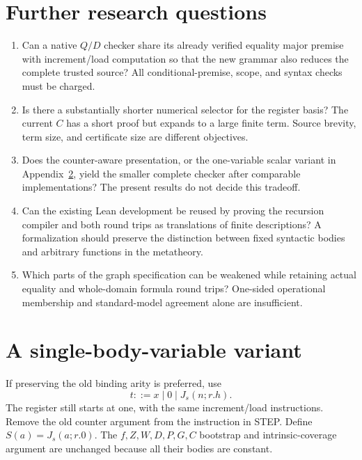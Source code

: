\documentclass[11pt,letterpaper]{article}
\theoremstyle{definition}\newtheorem{definition}[theorem]{Definition}
\theoremstyle{remark}\newtheorem{remark}[theorem]{Remark}
\begin{document}
\section{Further research questions}

\begin{enumerate}
\item Can a native $Q/D$ checker share its already verified equality
major premise with increment/load computation so that the new grammar
also reduces the complete trusted source? All conditional-premise,
scope, and syntax checks must be charged.
\item Is there a substantially shorter numerical selector for the
register basis? The current $C$ has a short proof but expands to a
large finite term. Source brevity, term size, and certificate size
are different objectives.
\item Does the counter-aware presentation, or the one-variable scalar
variant in Appendix~\ref{sec:scalar}, yield the smaller complete checker
after comparable implementations? The present results do not decide
this tradeoff.
\item Can the existing Lean development be reused by proving the
recursion compiler and both round trips as translations of finite
descriptions? A formalization should preserve the distinction between
fixed syntactic bodies and arbitrary functions in the metatheory.
\item Which parts of the graph specification can be weakened while
retaining actual equality and whole-domain formula round trips?
One-sided operational membership and standard-model agreement alone
are insufficient.
\end{enumerate}

\appendix
\section{A single-body-variable variant}\label{sec:scalar}

If preserving the old binding arity is preferred, use
\[
 t::=x\mid0\mid J_s(n;r.h).
\]
The register still starts at one, with the same increment/load
instructions. Remove the old counter argument from the instruction
in STEP. Define $S(a)=J_s(a;r.0)$. The $f,Z,W,D,P,G,C$ bootstrap
and intrinsic-coverage argument are unchanged because all their
bodies are constant.
\end{document}
